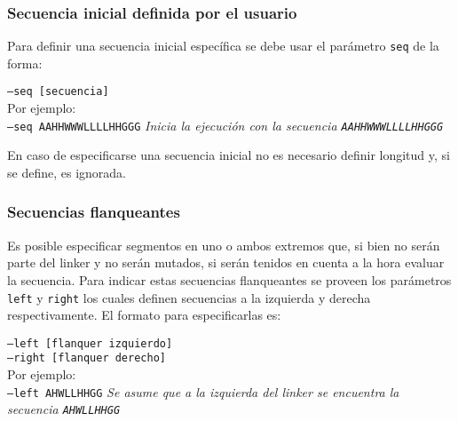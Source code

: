 \subsubsection{Secuencia inicial definida por el usuario}\label{secuenciaInicialDefinida}

Para definir una secuencia inicial específica se debe usar el parámetro \texttt{seq} de la forma:

\indent \texttt{--seq [secuencia]} 
\\Por ejemplo: \\
\indent \texttt{--seq AAHHWWWLLLLHHGGG} \hspace{0.5cm} \textit{Inicia la ejecución con la secuencia \texttt{AAHHWWWLLLLHHGGG}}

En caso de especificarse una secuencia inicial no es necesario definir longitud y, si se define, es ignorada.



\subsubsection{Secuencias flanqueantes}\label{flanqueantes} 

Es posible especificar segmentos en uno o ambos extremos que, si bien no serán parte del linker y no serán mutados, si serán tenidos en cuenta a la hora evaluar la secuencia.
Para indicar estas secuencias flanqueantes se proveen los parámetros \texttt{left} y \texttt{right} los cuales definen secuencias a la izquierda y derecha respectivamente.
El formato para especificarlas es:


\indent \texttt{--left  [flanquer izquierdo]} \\
\indent \texttt{--right [flanquer derecho]} 
\\Por ejemplo: \\
\indent \texttt{--left AHWLLHHGG} \hspace{0.5cm} \textit{Se asume que a la izquierda del linker se encuentra la secuencia \texttt{AHWLLHHGG}}





